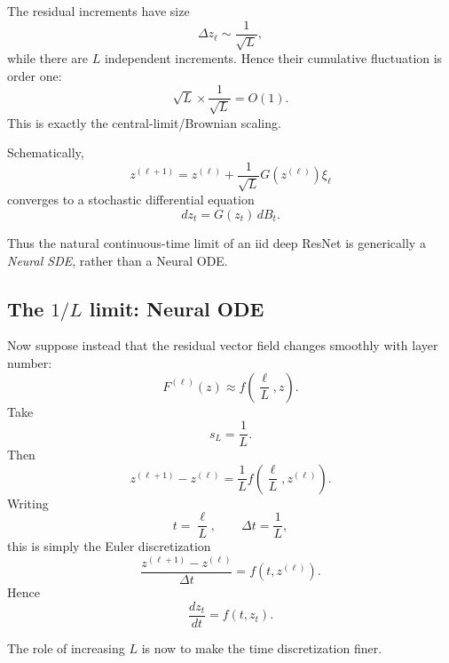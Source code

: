 The residual increments have size
\[
\Delta z_\ell
\sim
\frac{1}{\sqrt{L}},
\]
while there are \(L\) independent increments.  Hence their
cumulative fluctuation is order one:
\begin{equation}
    \sqrt{L}
    \times
    \frac{1}{\sqrt{L}}
    =
    O(1).
\end{equation}
This is exactly the central-limit/Brownian scaling.

Schematically,
\begin{equation}
    z^{(\ell+1)}
    =
    z^{(\ell)}
    +
    \frac{1}{\sqrt{L}}
    G\!\left(z^{(\ell)}\right)
    \xi_\ell
\end{equation}
converges to a stochastic differential equation
\begin{equation}
    \boxed{
    dz_t
    =
    G(z_t)\,dB_t.
    }
\end{equation}

Thus the natural continuous-time limit of an iid deep ResNet is
generically a \emph{Neural SDE}, rather than a Neural ODE.


\subsection{The \(1/L\) limit: Neural ODE}

Now suppose instead that the residual vector field changes
smoothly with layer number:
\begin{equation}
    F^{(\ell)}(z)
    \approx
    f\left(
        \frac{\ell}{L},z
    \right).
\end{equation}
Take
\begin{equation}
    s_L=\frac{1}{L}.
\end{equation}
Then
\begin{equation}
    z^{(\ell+1)}
    -
    z^{(\ell)}
    =
    \frac{1}{L}
    f\left(
        \frac{\ell}{L},
        z^{(\ell)}
    \right).
\end{equation}
Writing
\[
t=\frac{\ell}{L},
\qquad
\Delta t=\frac{1}{L},
\]
this is simply the Euler discretization
\begin{equation}
    \frac{
        z^{(\ell+1)}-z^{(\ell)}
    }{
        \Delta t
    }
    =
    f(t,z^{(\ell)}).
\end{equation}
Hence
\begin{equation}
    \boxed{
        \frac{dz_t}{dt}
        =
        f(t,z_t).
    }
\end{equation}

The role of increasing \(L\) is now to make the time
discretization finer.

